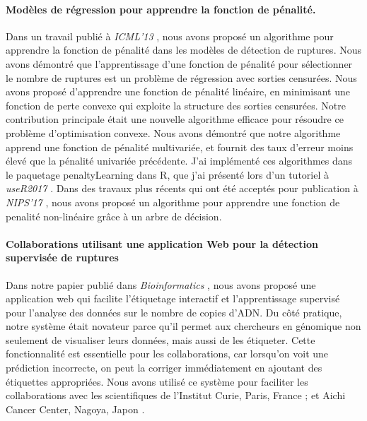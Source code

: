 \documentclass{article}
\begin{document}
\paragraph{Modèles de régression pour apprendre la fonction de pénalité.}

Dans un travail publié à \emph{ICML'13} \citep{HOCKING-penalties},
nous avons proposé un algorithme pour apprendre la fonction de
pénalité dans les modèles de détection de ruptures. Nous avons
démontré que l'apprentissage d'une fonction de pénalité pour
sélectionner le nombre de ruptures est un problème de régression avec
sorties censurées. Nous avons proposé d'apprendre une fonction de
pénalité linéaire, en minimisant une fonction de perte convexe qui
exploite la structure des sorties censurées. Notre contribution
principale était une nouvelle algorithme efficace pour résoudre ce
problème d'optimisation convexe. Nous avons démontré que notre
algorithme apprend une fonction de pénalité multivariée, et fournit
des taux d'erreur moins élevé que la pénalité univariée
précédente. J'ai implémenté ces algorithmes dans le paquetage
penaltyLearning dans R, que j'ai présenté lors d'un tutoriel à
\emph{useR2017} \citep{change-tutorial}. Dans des travaux plus récents
qui ont été acceptés pour publication à \emph{NIPS'17} \citep{MMIT},
nous avons proposé un algorithme pour apprendre une fonction de
penalité non-linéaire grâce à un arbre de décision.

\paragraph{Collaborations utilisant une application Web pour la
  détection supervisée de ruptures} Dans notre papier publié dans
\emph{Bioinformatics} \citep{hocking-SegAnnDB}, nous avons proposé une
application web qui facilite l'étiquetage interactif et
l'apprentissage supervisé pour l'analyse des données sur le nombre de
copies d'ADN. Du côté pratique, notre système était novateur parce
qu'il permet aux chercheurs en génomique non seulement de visualiser
leurs données, mais aussi de les étiqueter. Cette fonctionnalité est
essentielle pour les collaborations, car lorsqu'on voit une prédiction
incorrecte, on peut la corriger immédiatement en ajoutant des
étiquettes appropriées. 
Nous avons utilisé ce système pour faciliter les
collaborations avec les scientifiques de l'Institut Curie, Paris,
France \citep{Chicard}; et Aichi Cancer Center, Nagoya, Japon
\citep{Hocking-Leukemia-2016,m14:clonal}.
\end{document}
